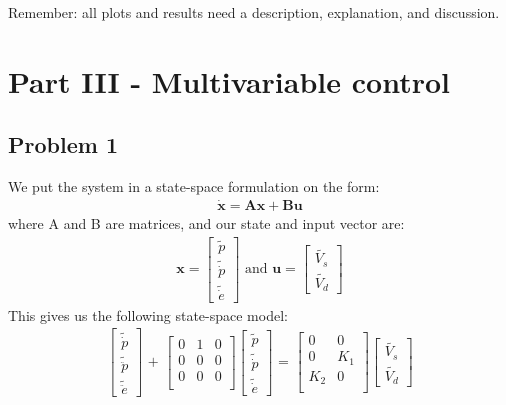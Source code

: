 Remember: all plots and results need a description, explanation, and discussion.


\section{Part III - Multivariable control}\label{sec:part3}
\subsection{Problem 1}
We put the system in a state-space formulation on the form:
\begin{gather*}
    \mathbf{\dot{x}} = \mathbf{Ax} + \mathbf{Bu}
\end{gather*}
where A and B are matrices, and our state and input vector are: 
\begin{gather*}
    \mathbf{x} = 
    \begin{bmatrix}
        \tilde{p}\\\tilde{\dot{p}}\\\tilde{\dot{e}}
        \end{bmatrix}
     \text{  and  } \mathbf{u} = 
    \begin{bmatrix} \tilde{V_s}\\\tilde{V_d} \end{bmatrix}
\end{gather*}
This gives us the following state-space model:
\begin{gather*}
     \begin{bmatrix}
        \tilde{\dot{p}}\\\tilde{\ddot{p}}\\\tilde{\ddot{e}}
    \end{bmatrix}
    \text{ + } \begin{bmatrix}
        0 & 1 & 0 \\
        0 & 0 & 0 \\
        0 & 0 & 0 \\ \end{bmatrix}
    \begin{bmatrix}
        \tilde{p}\\\tilde{\dot{p}}\\\tilde{\dot{e}}
    \end{bmatrix}
    \text{ = } \begin{bmatrix}
        0 & 0 \\
        0 & K_1 \\
        K_2 & 0 \\
    \end{bmatrix}
    \begin{bmatrix} \tilde{V_s}\\\tilde{V_d} \end{bmatrix}
\end{gather*}

